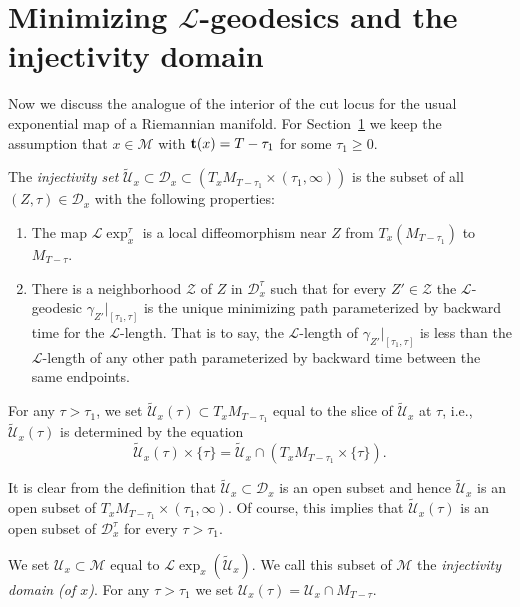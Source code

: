 \section{Minimizing ${\mathcal L}$-geodesics and the injectivity
domain}\label{sect:InjDom}

Now we discuss the analogue of the interior of the cut locus for the
usual exponential map of a Riemannian manifold. For
Section~\ref{sect:InjDom} we keep the assumption that $x\in
{\mathcal M}$ with ${\bf t}(x)=T-\tau_1$ for some $\tau_1\ge 0$.


\begin{definition}\label{def:l-injectivity-set}
\label{injdefn}
 The {\sl injectivity set}
$\widetilde{\mathcal U}_x\subset {\mathcal D}_x\subset
\left(T_xM_{T-\tau_1}\times (\tau_1,\infty)\right)$ is the subset of all $(Z,\tau)\in {\mathcal D}_x$ with the following
properties:
\begin{enumerate}
\item The map ${\mathcal L}\exp_x^{\tau}$ is a local
diffeomorphism near $Z$ from $T_x(M_{T-\tau_1})$ to $M_{T-\tau}$.
\item There is a neighborhood ${\mathcal Z}$ of $Z$ in ${\mathcal D}^{\tau}_x$
 such that for every $Z'\in {\mathcal Z}$ the ${\mathcal L}$-geodesic
$\gamma_{Z'}|_{[\tau_1,\tau]}$ is the unique minimizing path
parameterized by backward time for the ${\mathcal L}$-length. That
is to say, the ${\mathcal L}$-length of
$\gamma_{Z'}|_{[\tau_1,\tau]}$ is less than the ${\mathcal
L}$-length of any other path parameterized by backward time between
the same endpoints.
\end{enumerate}
For any $\tau>\tau_1$, we set $\widetilde {\mathcal
U}_x(\tau)\subset T_xM_{T-\tau_1}$ equal to the slice of $\widetilde{\mathcal U}_x$ at
$\tau$, i.e., $\widetilde {\mathcal U}_x(\tau)$ is determined by the
equation
$$\widetilde{\mathcal
U}_x(\tau)\times\{\tau\}=\widetilde{\mathcal
U}_x\cap\left(T_xM_{T-\tau_1}\times\{\tau\}\right).$$
\end{definition}

It is clear from the definition that $\widetilde{\mathcal
U}_x\subset {\mathcal D}_x$ is an open subset and hence
$\widetilde{\mathcal U}_x$ is an open subset of
$T_xM_{T-\tau_1}\times (\tau_1,\infty)$. Of course, this implies
that $\widetilde {\mathcal U}_x(\tau)$ is an open subset of
${\mathcal D}_x^\tau$ for every $\tau>\tau_1$.



\begin{definition}\label{def:l-injectivity-domain}
\label{L_x}
We set ${\mathcal U}_x\subset {\mathcal M}$ equal to $ {\mathcal L}\exp_x(\widetilde{\mathcal
U}_x)$. We call this subset of ${\mathcal M}$ the {\em injectivity
domain (of $x$)}.
 For any
$\tau>\tau_1$ we set ${\mathcal U}_x(\tau)={\mathcal U}_x\cap
M_{T-\tau}$.
\end{definition}

